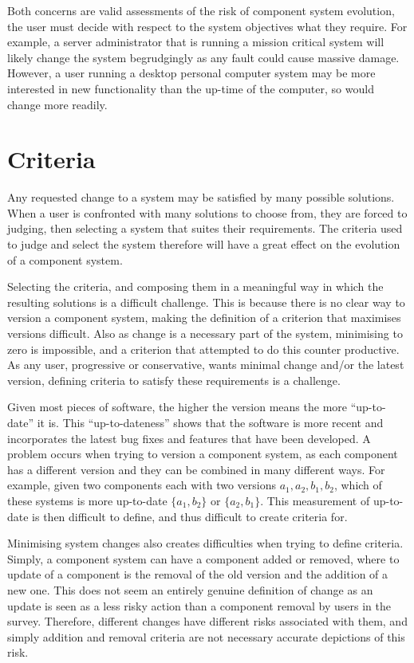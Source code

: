 Both concerns are valid assessments of the risk of component system evolution, the user must decide with respect to the system objectives what they require. 
For example, a server administrator that is running a mission critical system will likely change the system begrudgingly as any fault could cause massive damage.
However, a user running a desktop personal computer system may be more interested in new functionality than the up-time of the computer, so would change more readily.

\section{Criteria}
Any requested change to a system may be satisfied by many possible solutions.
When a user is confronted with many solutions to choose from, they are forced to judging, then selecting a system that suites their requirements.
The criteria used to judge and select the system therefore will have a great effect on the evolution of a component system.

Selecting the criteria, and composing them in a meaningful way in which the resulting solutions is a difficult challenge.
This is because there is no clear way to version a component system, making the definition of a criterion that maximises versions difficult.
Also as change is a necessary part of the system, minimising to zero is impossible, and a criterion that attempted to do this counter productive.
As any user, progressive or conservative, wants minimal change and/or the latest version, defining criteria to satisfy these requirements is a challenge.

Given most pieces of software, the higher the version means the more ``up-to-date'' it is.
This ``up-to-dateness'' shows that the software is more recent and incorporates the latest bug fixes and features that have been developed. 
A problem occurs when trying to version a component system, as each component has a different version and they can be combined in many different ways.
For example, given two components each with two versions $a_1,a_2,b_1,b_2$, which of these systems is more up-to-date $\{a_1,b_2\}$ or $\{a_2,b_1\}$.
This measurement of up-to-date is then difficult to define, and thus difficult to create criteria for.

Minimising system changes also creates difficulties when trying to define criteria.
Simply, a component system can have a component added or removed, where to update of a component is the removal of the old version and the addition of a new one.
This does not seem an entirely genuine definition of change as an update is seen as a less risky action than a component removal by users in the survey.  
Therefore, different changes have different risks associated with them, and simply addition and removal criteria are not necessary accurate depictions of this risk.

